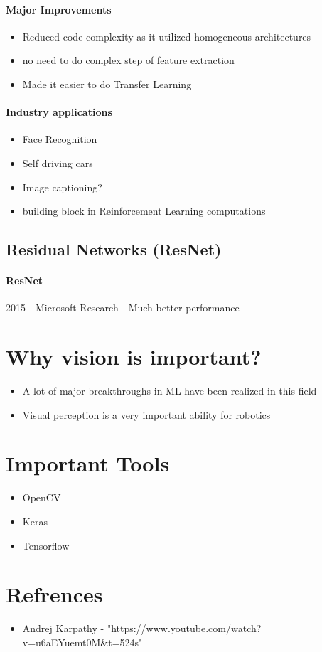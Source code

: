 \documentclass{article}
\begin{document}
		\paragraph{Major Improvements}
		\begin{itemize}
			\item Reduced code complexity as it utilized homogeneous architectures
			\item no need to do complex step of feature extraction
			\item Made it easier to do Transfer Learning
		\end{itemize}
		\paragraph{Industry applications}
		\begin{itemize}
			\item Face Recognition
			\item Self driving cars
			\item Image captioning?
			\item building block in Reinforcement Learning computations
		\end{itemize} 
	
	\subsection{Residual Networks (ResNet)}
		\paragraph{ResNet}
		2015 - Microsoft Research - Much better performance

	\section{Why vision is important?}
	\begin{itemize}
		\item A lot of major breakthroughs in ML have been realized in this field
		\item Visual perception is a very important ability for robotics
	\end{itemize}

	\section{Important Tools}
	\begin{itemize}
		\item OpenCV
		\item Keras
		\item Tensorflow
	\end{itemize}
	
	\section{Refrences}
		\begin{itemize}
			\item Andrej Karpathy -  "https://www.youtube.com/watch?v=u6aEYuemt0M\&t=524s"
		\end{itemize}
\end{document}
